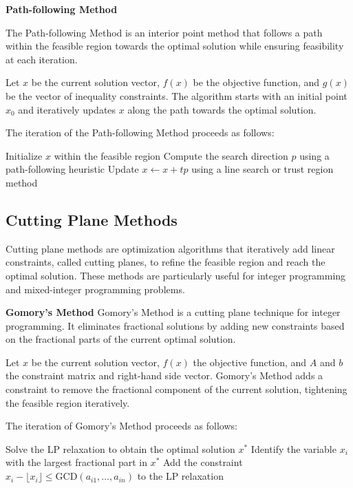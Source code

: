 \documentclass[12pt]{book} %
\begin{document}
\textbf{Path-following Method}

The Path-following Method is an interior point method that follows a path within the feasible region towards the optimal solution while ensuring feasibility at each iteration.

Let \(x\) be the current solution vector, \(f(x)\) be the objective function, and \(g(x)\) be the vector of inequality constraints. The algorithm starts with an initial point \(x_0\) and iteratively updates \(x\) along the path towards the optimal solution.

The iteration of the Path-following Method proceeds as follows:
\FloatBarrier
\begin{algorithm}[H]
\caption{Path-following Method}
\begin{algorithmic}[1]
\State Initialize \(x\) within the feasible region
\State Compute the search direction \(p\) using a path-following heuristic
\State Update \(x \leftarrow x + t p\) using a line search or trust region method
\EndWhile
\end{algorithmic}
\end{algorithm}
\FloatBarrier

\subsection{Cutting Plane Methods}
Cutting plane methods are optimization algorithms that iteratively add linear constraints, called cutting planes, to refine the feasible region and reach the optimal solution. These methods are particularly useful for integer programming and mixed-integer programming problems.

\textbf{Gomory's Method}
Gomory's Method is a cutting plane technique for integer programming. It eliminates fractional solutions by adding new constraints based on the fractional parts of the current optimal solution.

Let \(x\) be the current solution vector, \(f(x)\) the objective function, and \(A\) and \(b\) the constraint matrix and right-hand side vector. Gomory's Method adds a constraint to remove the fractional component of the current solution, tightening the feasible region iteratively.


The iteration of Gomory's Method proceeds as follows:
\FloatBarrier
\begin{algorithm}[H]
\caption{Gomory's Method}
\begin{algorithmic}[1]
\State Solve the LP relaxation to obtain the optimal solution \(x^*\)
\State Identify the variable \(x_i\) with the largest fractional part in \(x^*\)
\State Add the constraint \(x_i - \lfloor x_i \rfloor \leq \text{{GCD}}(a_{i1}, \ldots, a_{in})\) to the LP relaxation
\EndIf
\end{algorithmic}
\end{algorithm}
\FloatBarrier
\end{document}

